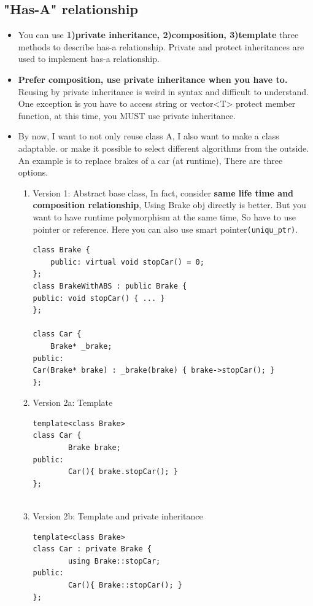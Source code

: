 \documentclass[a4paper,11pt,twoside]{book}
\begin{document}
\subsection{"Has-A" relationship}
\begin{itemize}
	\item You can use \textbf{1)private inheritance, 2)composition, 3)template} three methods to describe has-a relationship. Private and protect inheritances are used to implement has-a relationship. 

	\item \textbf{Prefer composition, use private inheritance when you have to.} Reusing by private inheritance is weird in syntax and difficult to understand. One exception is you have to access string or vector<T> protect member function, at this time, you MUST use private inheritance.
	
	\item By now, I want to not only reuse class A, I also want to make a class adaptable. or make it possible to select different algorithms from the outside.  An example is  to replace brakes of a car (at runtime), There are three options.
	\begin{enumerate}
		\item Version 1: Abstract base class, In fact, consider \textbf{same life time and composition relationship},  Using Brake obj directly is better. But you want to have runtime polymorphism at the same time, So have to use pointer or reference. Here you can also use smart pointer\texttt{(uniqu\_ptr)}.
\begin{lstlisting}[numbers=none]
class Brake {
	public: virtual void stopCar() = 0;
};	
class BrakeWithABS : public Brake {
public: void stopCar() { ... }
};
		
class Car {
	Brake* _brake;
public:
Car(Brake* brake) : _brake(brake) { brake->stopCar(); }
};
\end{lstlisting}
		
		\item Version 2a: Template
		
\begin{lstlisting}[numbers=none]
template<class Brake>
class Car {
		Brake brake;
public:
		Car(){ brake.stopCar(); }
};
		
\end{lstlisting}
		\item Version 2b: Template and private inheritance
\begin{lstlisting}[numbers=none]
template<class Brake>
class Car : private Brake {
		using Brake::stopCar;
public:
		Car(){ Brake::stopCar(); }
};
\end{lstlisting}
	\end{enumerate}
	

\end{itemize}
\end{document}
